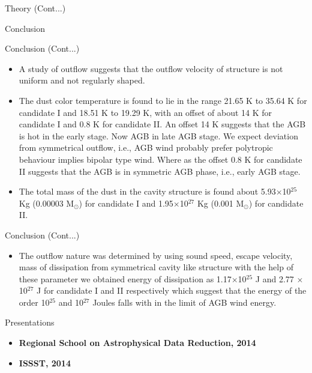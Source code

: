\documentclass[12pt,a4paper]{beamer}
\begin{document}
\begin{frame}{Theory (Cont...)}
\begin{frame}{Conclusion}
\begin{itemize}
\end{itemize}
\end{frame}



\begin{frame}{Conclusion (Cont...)}
\begin{itemize}
\item A
study of outflow suggests that the outflow velocity of structure
is not uniform and not regularly shaped. \item The dust color
temperature is found to lie in the range 21.65 K to 35.64 K for
candidate I and 18.51 K to 19.29 K, with an offset of about 14 K
for candidate I and 0.8 K for candidate II. An offset 14 K
suggests that the AGB is hot in the early stage. Now AGB in late
AGB stage. We expect deviation from symmetrical outflow, i.e., AGB
wind probably prefer polytropic behaviour implies bipolar type
wind. Where as the offset 0.8 K for candidate II suggests that the
AGB is in symmetric AGB phase, i.e., early AGB stage.
\item The
total mass of the dust in the cavity structure is found about
5.93$\times$10$^{25}$ Kg (0.00003 M$_{\odot}$) for candidate I and
1.95$\times$10$^{27}$ Kg (0.001 M$_{\odot}$) for candidate II.
\end{itemize}
\end{frame}


\begin{frame}{Conclusion   (Cont...)}
\begin{itemize}
\item The outflow nature was determined by using sound speed,
escape velocity, mass of dissipation from symmetrical cavity like
structure with the help of these parameter we obtained energy of
dissipation as 1.17$\times$10$^{25}$ J and 2.77 $\times$ 10$^{27}$
J for candidate I and II respectively which suggest that the
energy of the order 10$^{25}$ and 10$^{27}$ Joules falls with in
the limit of AGB wind energy.
\end{itemize}
\end{frame}

\begin{frame}
\begin{center}
\Large\bf\color{red}{Presentations}
\end{center}
\end{frame}
\begin{frame}{Presentations}
\begin{itemize}
\item \textbf{Regional School on Astrophysical Data Reduction, 2014}
\item \textbf{ISSST, 2014}
\end{itemize}
\end{frame}


\end{frame}
\end{document}
